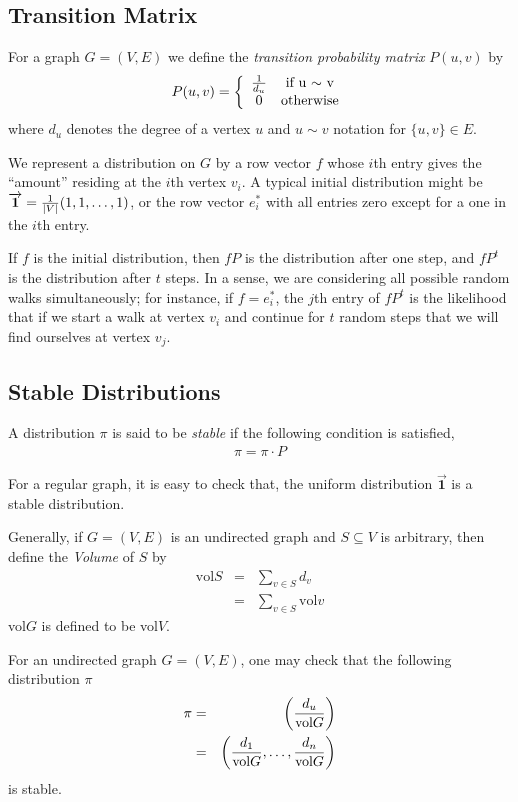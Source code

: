 \subsection{Transition Matrix}
For a graph $G=(V,E)$ we define the \emph{transition probability matrix} $P(u,v)$ by
\begin{eqnarray*}
P(u,v)=\left\{
\begin{array}{cc}
1\over d_u & \textrm{if u $\sim$ v}\\
0 & \textrm{otherwise}
\end{array}
\right.
\end{eqnarray*}
where $d_u$ denotes the degree of a vertex $u$ and $u\sim v$ notation for
$\{u,v\}\in E$.

We represent a distribution on $G$ by a row vector $f$ whose $i$th
entry gives the ``amount'' residing at the $i$th vertex $v_i$. A
typical initial distribution might be
$\overrightarrow{\mathbf{1}}={1\over |V|}(1,1,\dots,1)$, or the row
vector $e^*_i$ with all entries zero except for a one in the $i$th
entry.

If $f$ is the initial distribution, then $fP$ is the distribution after one step,
and $fP^t$ is the distribution after $t$ steps. In a sense, we are considering all
possible random walks simultaneously; for instance, if $f=e^*_i$, the $j$th entry of
$fP^t$ is the likelihood that if we start a walk at vertex $v_i$ and continue for
$t$ random steps that we will find ourselves at vertex $v_j$.

\subsection{Stable Distributions}
A distribution $\pi$ is said to be \emph{stable} if the following condition is
satisfied,
\begin{eqnarray*}
\pi = \pi \cdot P
\end{eqnarray*}

For a regular graph, it is easy to check that, the uniform distribution
$\overrightarrow{\mathbf{1}}$ is a stable distribution.

Generally, if $G=(V,E)$ is an undirected graph and $S\subseteq V$ is arbitrary, then
define the \emph{Volume} of $S$ by
\begin{eqnarray*}
\text{vol} S&=&\sum_{v\in S}d_v\\
&=&\sum_{v\in S}\text{vol} v
\end{eqnarray*}
vol$G$ is defined to be vol$V$.

For an undirected graph $G=(V,E)$, one may check that the following distribution
$\pi$
\begin{eqnarray*}
\pi&=&\left(d_u\over\text{vol}G\right)\\
&=&\left({d_1\over \text{vol}G}, \dots, {d_n\over\text{vol}G}\right)
\end{eqnarray*}
is stable.

